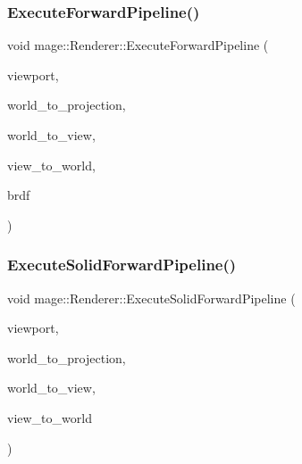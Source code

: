 \hypertarget{classmage_1_1_renderer_a37abb92510abee24538a556d0ef6c0c2}{}\label{classmage_1_1_renderer_a37abb92510abee24538a556d0ef6c0c2} 
\subsubsection{\texorpdfstring{Execute\+Forward\+Pipeline()}{ExecuteForwardPipeline()}}
{\footnotesize\ttfamily void mage\+::\+Renderer\+::\+Execute\+Forward\+Pipeline (\begin{DoxyParamCaption}\item[{const \hyperlink{classmage_1_1_viewport}{Viewport} \&}]{viewport,  }\item[{F\+X\+M\+M\+A\+T\+R\+IX}]{world\+\_\+to\+\_\+projection,  }\item[{C\+X\+M\+M\+A\+T\+R\+IX}]{world\+\_\+to\+\_\+view,  }\item[{C\+X\+M\+M\+A\+T\+R\+IX}]{view\+\_\+to\+\_\+world,  }\item[{\hyperlink{namespacemage_ae7a7a03a7b34d7e2689689bb8295cd38}{B\+R\+D\+F\+Type}}]{brdf }\end{DoxyParamCaption})\hspace{0.3cm}{\ttfamily [private]}}

\hypertarget{classmage_1_1_renderer_a32a06dca63b1c842ffb92007ca8144a9}{}\label{classmage_1_1_renderer_a32a06dca63b1c842ffb92007ca8144a9} 
\subsubsection{\texorpdfstring{Execute\+Solid\+Forward\+Pipeline()}{ExecuteSolidForwardPipeline()}}
{\footnotesize\ttfamily void mage\+::\+Renderer\+::\+Execute\+Solid\+Forward\+Pipeline (\begin{DoxyParamCaption}\item[{const \hyperlink{classmage_1_1_viewport}{Viewport} \&}]{viewport,  }\item[{F\+X\+M\+M\+A\+T\+R\+IX}]{world\+\_\+to\+\_\+projection,  }\item[{C\+X\+M\+M\+A\+T\+R\+IX}]{world\+\_\+to\+\_\+view,  }\item[{C\+X\+M\+M\+A\+T\+R\+IX}]{view\+\_\+to\+\_\+world }\end{DoxyParamCaption})\hspace{0.3cm}{\ttfamily [private]}}


